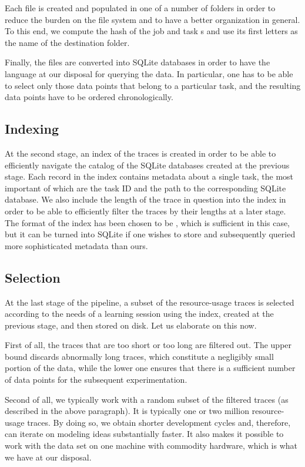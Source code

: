 Each  file is created and populated in one of a number of folders in
order to reduce the burden on the file system and to have a better organization
in general. To this end, we compute the  hash of the job and task
s and use its first letters as the name of the destination folder.

Finally, the  files are converted into SQLite databases in order to have
the  language at our disposal for querying the data. In particular, one
has to be able to select only those data points that belong to a particular
task, and the resulting data points have to be ordered chronologically.

\subsection{Indexing} 
At the second stage, an index of the traces is created in order to be able to
efficiently navigate the catalog of the SQLite databases created at the previous
stage. Each record in the index contains metadata about a single task, the most
important of which are the task ID and the path to the corresponding SQLite
database. We also include the length of the trace in question into the index in
order to be able to efficiently filter the traces by their lengths at a later
stage. The format of the index has been chosen to be , which is
sufficient in this case, but it can be turned into SQLite if one wishes to store
and subsequently queried more sophisticated metadata than ours.

\subsection{Selection} 
At the last stage of the pipeline, a subset of the resource-usage traces is
selected according to the needs of a learning session using the index, created
at the previous stage, and then stored on disk. Let us elaborate on this now.

First of all, the traces that are too short or too long are filtered out. The
upper bound discards abnormally long traces, which constitute a negligibly small
portion of the data, while the lower one ensures that there is a sufficient
number of data points for the subsequent experimentation.

Second of all, we typically work with a random subset of the filtered traces (as
described in the above paragraph). It is typically one or two million
resource-usage traces. By doing so, we obtain shorter development cycles and,
therefore, can iterate on modeling ideas substantially faster. It also makes it
possible to work with the data set on one machine with commodity hardware, which
is what we have at our disposal.

